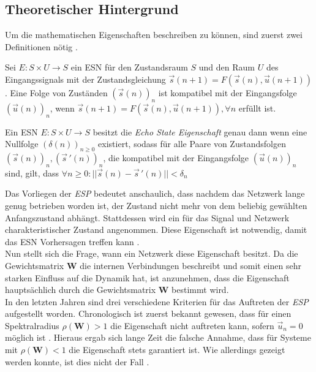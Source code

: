 \subsection{Theoretischer Hintergrund}
\label{sc:esn_theory}
Um die mathematischen Eigenschaften beschreiben zu können, sind zuerst zwei Definitionen nötig \cite{yildiz}.

\begin{definition}
Sei $E : S \times U \rightarrow S$ ein \textsc{ESN} für den Zustandsraum $S$ und den Raum $U$ des Eingangssignals mit der Zustandsgleichung $\vec{s}(n+1) = F \left( \vec{s}(n), \vec{u}(n+1) \right)$. Eine Folge von Zuständen $(\vec{s}(n))_n$ ist kompatibel mit der Eingangsfolge $(\vec{u}(n))_n$, wenn $\vec{s}(n+1) = F\left( \vec{s}(n), \vec{u}(n+1) \right), \forall n$ erfüllt ist.
\end{definition}

\begin{definition}
Ein \textsc{ESN} $E : S \times U \rightarrow S$ besitzt die \textit{Echo State Eigenschaft} genau dann wenn eine Nullfolge $(\delta(n))_{n \geq 0}$ existiert, sodass für alle Paare von Zustandsfolgen $(\vec{s}(n))_n, (\vec{s}\,'(n))_n$, die kompatibel mit der Eingangsfolge $(\vec{u}(n))_n$ sind, gilt, dass $\forall n \geq 0 : ||\vec{s}(n) - \vec{s}\,'(n)|| < \delta_n$
\end{definition} 
Das Vorliegen der \textit{ESP} bedeutet anschaulich, dass nachdem das Netzwerk lange genug betrieben worden ist, der Zustand nicht mehr von dem beliebig gewählten Anfangszustand abhängt. Stattdessen wird ein für das Signal und Netzwerk charakteristischer Zustand angenommen. Diese Eigenschaft ist notwendig, damit das \textsc{ESN} Vorhersagen treffen kann \cite{jeagerTut2002}.\\

Nun stellt sich die Frage, wann ein Netzwerk diese Eigenschaft besitzt. Da die Gewichtsmatrix $\mathbf{W}$ die internen Verbindungen beschreibt und somit einen sehr starken Einfluss auf die Dynamik hat, ist anzunehmen, dass die Eigenschaft hauptsächlich durch die Gewichtsmatrix $\mathbf{W}$ bestimmt wird.\\

In den letzten Jahren sind drei verschiedene Kriterien für das Auftreten der \textit{ESP} aufgestellt worden. Chronologisch ist zuerst bekannt gewesen, dass für einen Spektralradius $\rho(\mathbf{W}) > 1$ die Eigenschaft nicht auftreten kann, sofern $\vec{u}_n = 0$ möglich ist \cite{jaeger2007, jaeger2010}. Hieraus ergab sich lange Zeit die falsche Annahme, dass für Systeme mit $\rho(\mathbf{W}) < 1$ die Eigenschaft stets garantiert ist. Wie allerdings gezeigt werden konnte, ist dies nicht der Fall \citep{yildiz}.\\

